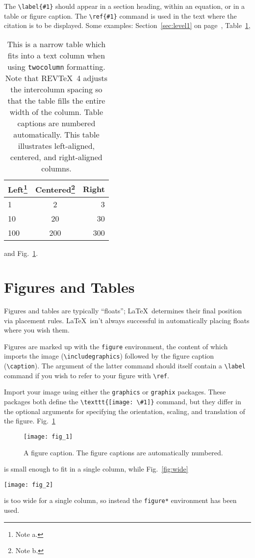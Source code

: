 \documentclass[%
 aip,
 jmp,%
 amsmath,amssymb,
preprint,%
 reprint,%
]{revtex4-2}
\begin{document}
The \verb+\label{#1}+ should appear in a section heading, within an
equation, or in a table or figure caption. The \verb+\ref{#1}+ command
is used in the text where the citation is to be displayed.  Some
examples: Section~\ref{sec:level1} on page~\pageref{sec:level1},
Table~\ref{tab:table1},%
\begin{table}
  \caption{\label{tab:table1}This is a narrow table which fits into a
    text column when using \texttt{twocolumn} formatting. Note that
    REV\TeX~4 adjusts the intercolumn spacing so that the table fills the
    entire width of the column. Table captions are numbered
    automatically. This table illustrates left-aligned, centered, and
    right-aligned columns.  }
  \begin{ruledtabular}
    \begin{tabular}{lcr}
      Left\footnote{Note a.} & Centered\footnote{Note b.} & Right \\
      \hline
      1                      & 2                          & 3     \\
      10                     & 20                         & 30    \\
      100                    & 200                        & 300   \\
    \end{tabular}
  \end{ruledtabular}
\end{table}
and Fig.~\ref{fig:epsart}.

\section{Figures and Tables}
Figures and tables are typically ``floats''; \LaTeX\ determines their
final position via placement rules.
\LaTeX\ isn't always successful in automatically placing floats where you wish them.

Figures are marked up with the \texttt{figure} environment, the content of which
imports the image (\verb+\includegraphics+) followed by the figure caption (\verb+\caption+).
The argument of the latter command should itself contain a \verb+\label+ command if you
wish to refer to your figure with \verb+\ref+.

Import your image using either the \texttt{graphics} or
\texttt{graphix} packages. These packages both define the
\verb+\texttt{[image: \#1]}+ command, but they differ in the optional
arguments for specifying the orientation, scaling, and translation of the figure.
Fig.~\ref{fig:epsart}%
\begin{figure}
  \texttt{[image: fig\_1]}%
  \caption{\label{fig:epsart} A figure caption. The figure captions are
    automatically numbered.}
\end{figure}
is small enough to fit in a single column, while
Fig.~\ref{fig:wide}%
\begin{figure*}
  \texttt{[image: fig\_2]}%
  \caption{\label{fig:wide}Use the \texttt{figure*} environment to get a wide
    figure, spanning the page in \texttt{twocolumn} formatting.}
\end{figure*}
is too wide for a single column,
so instead the \texttt{figure*} environment has been used.
\end{document}
